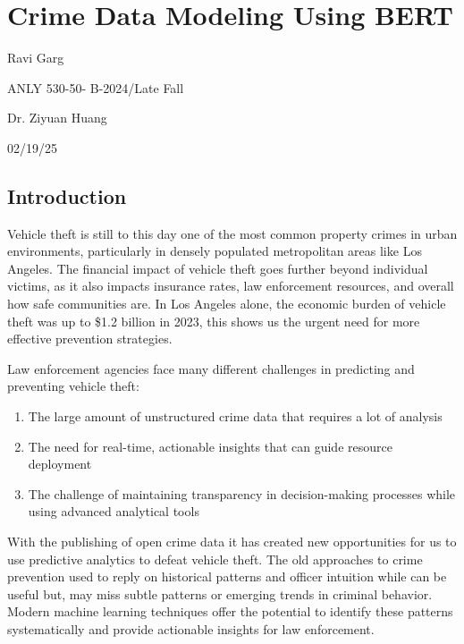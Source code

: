 \documentclass[
]{article}
\author{}
\date{}
\begin{document}
\section{\texorpdfstring{\textbf{Crime Data Modeling Using
BERT}}{Crime Data Modeling Using BERT}}\label{crime-data-modeling-using-bert}

Ravi Garg

ANLY 530-50- B-2024/Late Fall

Dr. Ziyuan Huang

02/19/25

\subsection{Introduction}\label{introduction}

Vehicle theft is still to this day one of the most common property
crimes in urban environments, particularly in densely populated
metropolitan areas like Los Angeles. The financial impact of vehicle
theft goes further beyond individual victims, as it also impacts
insurance rates, law enforcement resources, and overall how safe
communities are. In Los Angeles alone, the economic burden of vehicle
theft was up to \$1.2 billion in 2023, this shows us the urgent need for
more effective prevention strategies.

Law enforcement agencies face many different challenges in predicting
and preventing vehicle theft:

\begin{enumerate}
\def\labelenumi{\arabic{enumi}.}
\item
  The large amount of unstructured crime data that requires a lot of
  analysis
\item
  The need for real-time, actionable insights that can guide resource
  deployment
\item
  The challenge of maintaining transparency in decision-making processes
  while using advanced analytical tools
\end{enumerate}

With the publishing of open crime data it has created new opportunities
for us to use predictive analytics to defeat vehicle theft. The old
approaches to crime prevention used to reply on historical patterns and
officer intuition while can be useful but, may miss subtle patterns or
emerging trends in criminal behavior. Modern machine learning techniques
offer the potential to identify these patterns systematically and
provide actionable insights for law enforcement.
\end{document}
